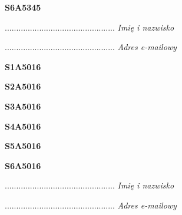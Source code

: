 \begin{turn}{90}\huge \textbf{S6A5345}\end{turn}

\begin{turn}{90}\begin{minipage}{\linewidth} \vspace{20mm} ................................................  \textit{Imię i nazwisko}\end{minipage}\end{turn}

\begin{turn}{90}\begin{minipage}{\linewidth} \vspace{20mm} ................................................  \textit{Adres e-mailowy}\end{minipage}\end{turn}

\begin{turn}{90}\huge \textbf{S1A5016}\end{turn}

\begin{turn}{90}\huge \textbf{S2A5016}\end{turn}

\begin{turn}{90}\huge \textbf{S3A5016}\end{turn}

\begin{turn}{90}\huge \textbf{S4A5016}\end{turn}

\begin{turn}{90}\huge \textbf{S5A5016}\end{turn}

\begin{turn}{90}\huge \textbf{S6A5016}\end{turn}

\begin{turn}{90}\begin{minipage}{\linewidth} \vspace{20mm} ................................................  \textit{Imię i nazwisko}\end{minipage}\end{turn}

\begin{turn}{90}\begin{minipage}{\linewidth} \vspace{20mm} ................................................  \textit{Adres e-mailowy}\end{minipage}\end{turn}

